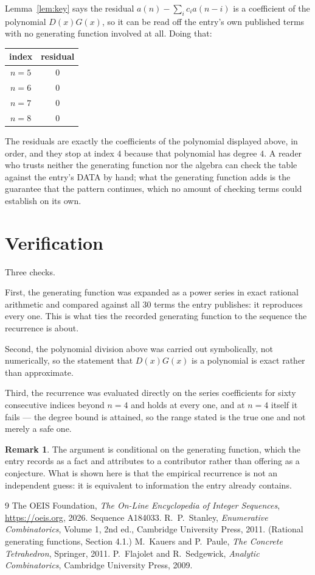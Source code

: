 \documentclass[11pt,a4paper]{article}
\theoremstyle{plain}
\theoremstyle{definition}
\newtheorem{remark}[theorem]{Remark}
\begin{document}
Lemma~\ref{lem:key} says the residual $a(n)-\sum_ic_ia(n-i)$ is a coefficient of the
polynomial $D(x)G(x)$, so it can be read off the entry's own published terms with no
generating function involved at all. Doing that:
\begin{center}
\begin{tabular}{cc}
index & residual \\ \hline
$n=5$ & $0$ \\
$n=6$ & $0$ \\
$n=7$ & $0$ \\
$n=8$ & $0$
\end{tabular}
\end{center}
The residuals are exactly the coefficients of the polynomial displayed above, in order, and
they stop at index $4$ because that polynomial has degree $4$. A reader who trusts
neither the generating function nor the algebra can check the table against the entry's DATA
by hand; what the generating function adds is the guarantee that the pattern continues, which
no amount of checking terms could establish on its own.

\section{Verification}

Three checks.

First, the generating function was expanded as a power series in exact rational arithmetic and
compared against all $30$ terms the entry publishes: it reproduces every one. This is
what ties the recorded generating function to the sequence the recurrence is about.

Second, the polynomial division above was carried out symbolically, not numerically, so the
statement that $D(x)G(x)$ is a polynomial is exact rather than approximate.

Third, the recurrence was evaluated directly on the series coefficients for sixty consecutive
indices beyond $n=4$ and holds at every one, and at $n=4$ itself it fails --- the
degree bound is attained, so the range stated is the true one and not merely a safe one.

\begin{remark}
The argument is conditional on the generating function, which the entry records as a fact and
attributes to a contributor rather than offering as a conjecture. What is shown here is that
the empirical recurrence is not an independent guess: it is equivalent to information the
entry already contains.
\end{remark}

\begin{thebibliography}{9}
 The OEIS Foundation, \emph{The On-Line Encyclopedia of Integer
Sequences}, \url{https://oeis.org}, 2026. Sequence A184033.
 R.~P.~Stanley, \emph{Enumerative Combinatorics}, Volume 1, 2nd ed.,
Cambridge University Press, 2011. (Rational generating functions, Section 4.1.)
 M.~Kauers and P.~Paule, \emph{The Concrete Tetrahedron}, Springer, 2011.
 P.~Flajolet and R.~Sedgewick, \emph{Analytic Combinatorics}, Cambridge
University Press, 2009.
\end{thebibliography}
\end{document}
